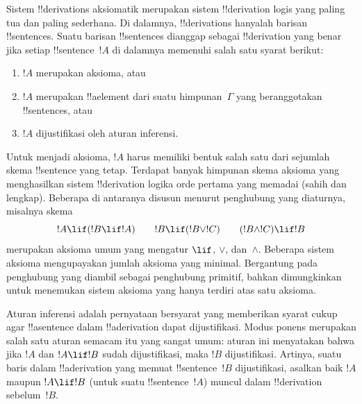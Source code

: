 \documentclass[../../../include/open-logic-section]{subfiles}
\begin{document}
      {}
      {}


Sistem !!{derivation}s aksiomatik merupakan sistem !!{derivation} logis
yang paling tua dan paling sederhana. Di dalamnya, !!{derivation}s
hanyalah barisan !!{sentence}s. Suatu barisan !!{sentence}s dianggap
sebagai !!{derivation} yang benar jika setiap !!{sentence}~$!A$ di
dalamnya memenuhi salah satu syarat berikut:
\begin{enumerate}
\item $!A$ merupakan aksioma, atau
\item $!A$ merupakan !!a{element} dari suatu himpunan~$\Gamma$ yang
  beranggotakan !!{sentence}s, atau
\item $!A$ dijustifikasi oleh aturan inferensi.
\end{enumerate}
Untuk menjadi aksioma, $!A$ harus memiliki bentuk salah satu dari
sejumlah skema !!{sentence} yang tetap. Terdapat banyak himpunan skema
aksioma yang menghasilkan sistem !!{derivation} logika orde pertama
yang memadai (sahih dan lengkap). Beberapa di antaranya disusun
menurut penghubung yang diaturnya, misalnya skema
\[
!A \lif (!B \lif !A) \qquad !B \lif (!B \lor !C) \qquad (!B \land !C) \lif !B
\]
merupakan aksioma umum yang mengatur $\lif$, $\lor$, dan~$\land$.
Beberapa sistem aksioma mengupayakan jumlah aksioma yang minimal.
Bergantung pada penghubung yang diambil sebagai penghubung primitif,
bahkan dimungkinkan untuk menemukan sistem aksioma yang hanya terdiri
atas satu aksioma.

Aturan inferensi adalah pernyataan bersyarat yang memberikan syarat
cukup agar !!a{sentence} dalam !!a{derivation} dapat dijustifikasi.
Modus ponens merupakan salah satu aturan semacam itu yang sangat umum:
aturan ini menyatakan bahwa jika $!A$ dan $!A \lif !B$ sudah
dijustifikasi, maka $!B$ dijustifikasi. Artinya, suatu baris dalam
!!a{derivation} yang memuat !!{sentence}~$!B$ dijustifikasi, asalkan
baik $!A$ maupun $!A \lif !B$ (untuk suatu !!{sentence}~$!A$) muncul
dalam !!{derivation} sebelum~$!B$.
\end{document}
